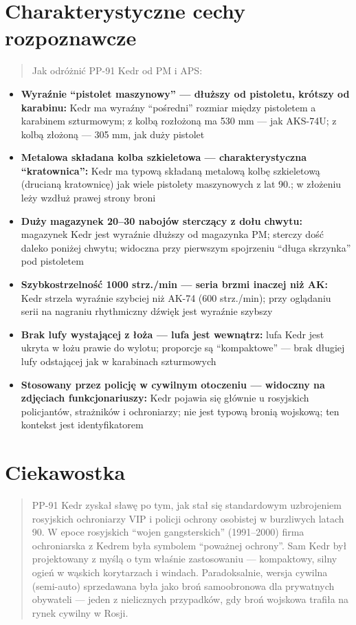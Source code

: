 \documentclass[12pt,openany,oneside]{book}
\providecommand{\tightlist}{%
  \setlength{\itemsep}{0pt}\setlength{\parskip}{0pt}}
\begin{document}
\section{Charakterystyczne cechy
rozpoznawcze}\label{charakterystyczne-cechy-rozpoznawcze-96}

\begin{quote}
Jak odróżnić PP-91 Kedr od PM i APS:
\end{quote}

\begin{itemize}
\tightlist
\item
  \textbf{Wyraźnie ``pistolet maszynowy'' --- dłuższy od pistoletu,
  krótszy od karabinu:} Kedr ma wyraźny ``pośredni'' rozmiar między
  pistoletem a karabinem szturmowym; z kolbą rozłożoną ma 530 mm --- jak
  AKS-74U; z kolbą złożoną --- 305 mm, jak duży pistolet
\item
  \textbf{Metalowa składana kolba szkieletowa --- charakterystyczna
  ``kratownica'':} Kedr ma typową składaną metalową kolbę szkieletową
  (drucianą kratownicę) jak wiele pistolety maszynowych z lat 90.; w
  złożeniu leży wzdłuż prawej strony broni
\item
  \textbf{Duży magazynek 20--30 nabojów sterczący z dołu chwytu:}
  magazynek Kedr jest wyraźnie dłuższy od magazynka PM; sterczy dość
  daleko poniżej chwytu; widoczna przy pierwszym spojrzeniu ``długa
  skrzynka'' pod pistoletem
\item
  \textbf{Szybkostrzelność 1000 strz./min --- seria brzmi inaczej niż
  AK:} Kedr strzela wyraźnie szybciej niż AK-74 (600 strz./min); przy
  oglądaniu serii na nagraniu rhythmiczny dźwięk jest wyraźnie szybszy
\item
  \textbf{Brak lufy wystającej z łoża --- lufa jest wewnątrz:} lufa Kedr
  jest ukryta w łożu prawie do wylotu; proporcje są ``kompaktowe'' ---
  brak długiej lufy odstającej jak w karabinach szturmowych
\item
  \textbf{Stosowany przez policję w cywilnym otoczeniu --- widoczny na
  zdjęciach funkcjonariuszy:} Kedr pojawia się głównie u rosyjskich
  policjantów, strażników i ochroniarzy; nie jest typową bronią
  wojskową; ten kontekst jest identyfikatorem
\end{itemize}

\section{Ciekawostka}\label{ciekawostka-96}

\begin{quote}
PP-91 Kedr zyskał sławę po tym, jak stał się standardowym uzbrojeniem
rosyjskich ochroniarzy VIP i policji ochrony osobistej w burzliwych
latach 90. W epoce rosyjskich ``wojen gangsterskich'' (1991--2000) firma
ochroniarska z Kedrem była symbolem ``poważnej ochrony''. Sam Kedr był
projektowany z myślą o tym właśnie zastosowaniu --- kompaktowy, silny
ogień w wąskich korytarzach i windach. Paradoksalnie, wersja cywilna
(semi-auto) sprzedawana była jako broń samoobronowa dla prywatnych
obywateli --- jeden z nielicznych przypadków, gdy broń wojskowa trafiła
na rynek cywilny w Rosji.
\end{quote}
\end{document}
